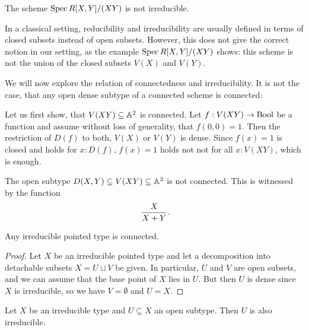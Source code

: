 \begin{example}
  The scheme $\operatorname{Spec} R[X,Y]/(XY)$ is not irreducible.
\end{example}

\begin{remark}
  In a classical setting,
  reducibility and irreducibility are usually defined
  in terms of closed subsets instead of open subsets.
  However, this does not give the correct notion in our setting,
  as the example $\operatorname{Spec} R[X, Y]/(XY)$ shows:
  this scheme is not the union of the closed subsets $V(X)$ and $V(Y)$.
\end{remark}

We will now explore the relation of connectedness and irreducibility.
It is not the case, that any open dense subtype of a connected scheme is connected:

\begin{example}
  Let us first show,
  that $V(XY)\subseteq \mathbb{A}^2$ is connected.
  Let $f:V(XY)\to \mathrm{Bool}$ be a function and assume without loss of generality,
  that $f(0,0)=1$.
  Then the restriction of $D(f)$ to both, $V(X)$ or $V(Y)$ is dense.
  Since $f(x)=1$ is closed and holds for $x:D(f)$, $f(x)=1$ holds not not for all $x:V(XY)$,
  which is enough.
    
  The open subtype $D(X,Y)\subseteq V(XY)\subseteq \mathbb{A}^2$ is not connected.
  This is witnessed by the function
  \[
    \frac{X}{X+Y}
    \rlap{.}
  \]
\end{example}

\begin{proposition}%
  \label{irreducible-implies-connected}
  Any irreducible pointed type is connected.
\end{proposition}

\begin{proof}
  Let $X$ be an irreducible pointed type
  and let a decomposition into detachable subsets $X = U \sqcup V$ be given.
  In particular, $U$ and $V$ are open subsets,
  and we can assume that the base point of $X$ lies in $U$.
  But then $U$ is dense since $X$ is irreducible,
  so we have $V = \emptyset$ and $U = X$.
\end{proof}

\begin{proposition}%
  \label{open-subtype-of-irred-is-irred}
  Let $X$ be an irreducible type
  and $U \subseteq X$ an open subtype.
  Then $U$ is also irreducible.
\end{proposition}

